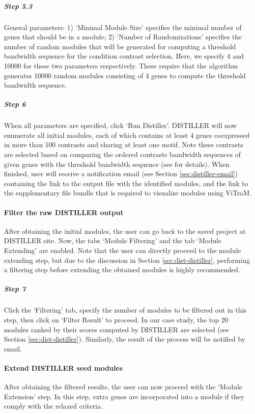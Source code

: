\begin{small}
\subparagraph{Step 5.3} General parameters: 1) `Minimal Module Size' specifies  the minimal number of genes that should be in a module; 2) `Number of Randomizations' specifies the number of random modules that will be generated for computing a threshold bandwidth sequence for the condition contrast selection.  Here, we specify 4 and 10000 for these two parameters respectively. These require that the algorithm generates 10000 random modules consisting of 4 genes to compute the threshold bandwidth sequence.

\subparagraph{Step 6} When all parameters are specified, click `Run Distiller'. DISTILLER will now enumerate all initial modules, each of which contains at least 4 genes coexpressed in more than 100 contrasts and sharing at least one motif. Note these contrasts are selected based on comparing the ordered contrasts bandwidth sequences of given genes with the threshold bandwidth sequence (see \cite{Lemmens2009} for details). When finished, user will receive a notification email (see Section  \ref{sec:distiller-email}) containing the link to the output file with the identified modules, and the link to the supplementary file bundle that is  required to visualize modules using ViTraM. 

\end{small} %


\paragraph{Filter the raw DISTILLER output} After obtaining the initial modules, the user can go back to the saved project at DISTILLER site.  Now, the tabs `Module Filtering' and the tab `Module Extending' are enabled.  Note that the user can directly proceed to the module extending step, but due to the discussion in Section \ref{sec:dist-distiller}, performing a filtering step before extending the obtained modules is highly recommended.

\begin{small} %
\subparagraph{Step 7} Click the `Filtering' tab, specify the number of modules to be filtered out in this step, then click on `Filter Result' to proceed.  In our case study, the top 20 modules ranked by their scores computed by DISTILLER are selected (see Section \ref{sec:dist-distiller}). Similarly, the result of the process will be notified by email.

\end{small}

\paragraph{Extend DISTILLER seed modules} After obtaining the filtered results, the user can now proceed with the `Module Extension' step. In this step, extra genes are incorporated into a module if they comply with the relaxed criteria.

